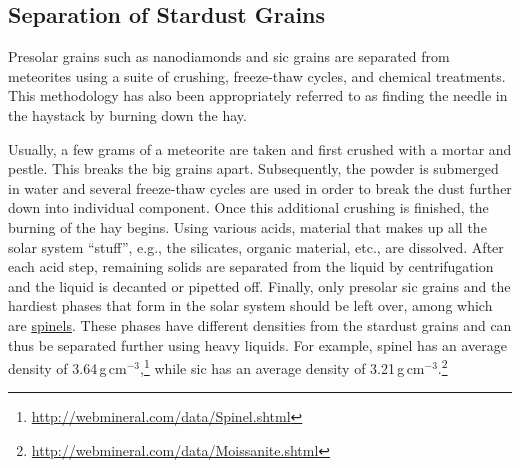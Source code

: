 \subsection{Separation of Stardust Grains}

Presolar grains such as nanodiamonds and \ac{sic} grains are separated from meteorites using a suite of crushing, freeze-thaw cycles, and chemical treatments. This methodology has also been appropriately referred to as finding the needle in the haystack by burning down the hay. 

Usually, a few grams of a meteorite are taken and first crushed with a mortar and pestle. This breaks the big grains apart. Subsequently, the powder is submerged in water and several freeze-thaw cycles are used in order to break the dust further down into individual component. Once this additional crushing is finished, the burning of the hay begins. Using various acids, material that makes up all the solar system ``stuff'', e.g., the silicates, organic material, etc., are dissolved. After each acid step, remaining solids are separated from the liquid by centrifugation and the liquid is decanted or pipetted off. Finally, only presolar \ac{sic} grains and the hardiest phases that form in the solar system should be left over, among which are \href{https://en.wikipedia.org/wiki/Spinel}{spinels}. These phases have different densities from the stardust grains and can thus be separated further using heavy liquids. For example, spinel has an average density of 3.64\,g\,cm$^{-3}$,\footnote{\url{http://webmineral.com/data/Spinel.shtml}} while \ac{sic} has an average density of 3.21\,g\,cm$^{-3}$.\footnote{\url{http://webmineral.com/data/Moissanite.shtml}}

